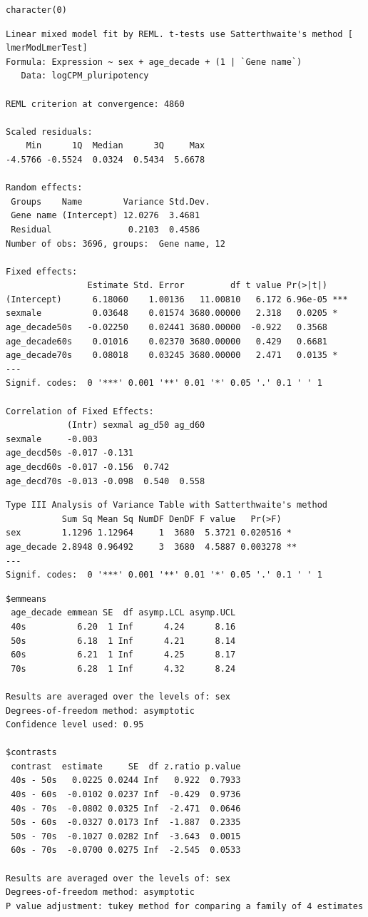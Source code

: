 \documentclass[
  letterpaper,
  DIV=11,
  numbers=noendperiod]{scrartcl}
\begin{document}
\begin{verbatim}
character(0)
\end{verbatim}

\begin{verbatim}
Linear mixed model fit by REML. t-tests use Satterthwaite's method [
lmerModLmerTest]
Formula: Expression ~ sex + age_decade + (1 | `Gene name`)
   Data: logCPM_pluripotency

REML criterion at convergence: 4860

Scaled residuals: 
    Min      1Q  Median      3Q     Max 
-4.5766 -0.5524  0.0324  0.5434  5.6678 

Random effects:
 Groups    Name        Variance Std.Dev.
 Gene name (Intercept) 12.0276  3.4681  
 Residual               0.2103  0.4586  
Number of obs: 3696, groups:  Gene name, 12

Fixed effects:
                Estimate Std. Error         df t value Pr(>|t|)    
(Intercept)      6.18060    1.00136   11.00810   6.172 6.96e-05 ***
sexmale          0.03648    0.01574 3680.00000   2.318   0.0205 *  
age_decade50s   -0.02250    0.02441 3680.00000  -0.922   0.3568    
age_decade60s    0.01016    0.02370 3680.00000   0.429   0.6681    
age_decade70s    0.08018    0.03245 3680.00000   2.471   0.0135 *  
---
Signif. codes:  0 '***' 0.001 '**' 0.01 '*' 0.05 '.' 0.1 ' ' 1

Correlation of Fixed Effects:
            (Intr) sexmal ag_d50 ag_d60
sexmale     -0.003                     
age_decd50s -0.017 -0.131              
age_decd60s -0.017 -0.156  0.742       
age_decd70s -0.013 -0.098  0.540  0.558
\end{verbatim}

\begin{verbatim}
Type III Analysis of Variance Table with Satterthwaite's method
           Sum Sq Mean Sq NumDF DenDF F value   Pr(>F)   
sex        1.1296 1.12964     1  3680  5.3721 0.020516 * 
age_decade 2.8948 0.96492     3  3680  4.5887 0.003278 **
---
Signif. codes:  0 '***' 0.001 '**' 0.01 '*' 0.05 '.' 0.1 ' ' 1
\end{verbatim}

\begin{verbatim}
$emmeans
 age_decade emmean SE  df asymp.LCL asymp.UCL
 40s          6.20  1 Inf      4.24      8.16
 50s          6.18  1 Inf      4.21      8.14
 60s          6.21  1 Inf      4.25      8.17
 70s          6.28  1 Inf      4.32      8.24

Results are averaged over the levels of: sex 
Degrees-of-freedom method: asymptotic 
Confidence level used: 0.95 

$contrasts
 contrast  estimate     SE  df z.ratio p.value
 40s - 50s   0.0225 0.0244 Inf   0.922  0.7933
 40s - 60s  -0.0102 0.0237 Inf  -0.429  0.9736
 40s - 70s  -0.0802 0.0325 Inf  -2.471  0.0646
 50s - 60s  -0.0327 0.0173 Inf  -1.887  0.2335
 50s - 70s  -0.1027 0.0282 Inf  -3.643  0.0015
 60s - 70s  -0.0700 0.0275 Inf  -2.545  0.0533

Results are averaged over the levels of: sex 
Degrees-of-freedom method: asymptotic 
P value adjustment: tukey method for comparing a family of 4 estimates 
\end{verbatim}
\end{document}
